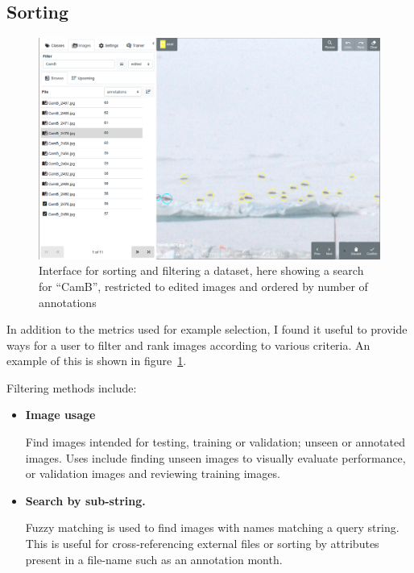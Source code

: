 \subsection {Sorting}

\begin{figure}[!h]
  \centering
  \includegraphics[width=1.0\linewidth]{figures/annotation/screenshots/sort_filter.png}
  \caption{Interface for sorting and filtering a dataset, here showing a search for ``CamB'', restricted to edited images and ordered by number of annotations}  
  \label{fig:sorting_filtering}
\end{figure}

In addition to the metrics used for example selection, I found it useful to provide ways for a user to filter and rank images according to various criteria. An example of this is shown in figure~\ref{fig:sorting_filtering}.

Filtering methods include:

\begin{itemize}
    \item {\bf Image usage } \par
Find images intended for testing, training or validation; unseen or annotated images. Uses include finding unseen images to visually evaluate performance, or validation images and reviewing training images.

\item {\bf Search by sub-string.} \par

Fuzzy matching is used to find images with names matching a query string. This is useful for cross-referencing external files or sorting by attributes present in a file-name such as an annotation month.

\end{itemize}

